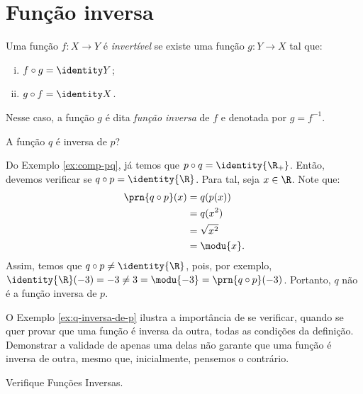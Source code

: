 \section{Função inversa}

\begin{definition}
\label{def:funcao-inversa}
Uma função $f: X \to Y$ é \emph{invertível} se existe uma função $g: Y \to X$ tal que:
%
\begin{enumerate}[(i)]
  \item $f \circ g = \identity Y$;
  \item $g \circ f = \identity X$.
\end{enumerate}
%
Nesse caso, a função $g$ é dita \emph{função inversa} de $f$ e denotada por $g = f^{-1}$.
\end{definition}

\begin{example}
\label{ex:q-inversa-de-p}
    A função $q$ é inversa de $p$?
\end{example}

\begin{solution}
Do Exemplo \ref{ex:comp-pq}, já temos que $p \circ q = \identity{\R_+}$.
Então, devemos verificar se $q \circ p = \identity{\R}$.
Para tal, seja $x \in \R$. 
Note que:
%
\begin{align*}
    \prn{q \circ p}(x) &= q(p(x)) \\ &= q(x^2) \\ &= \sqrt{x^2} \\ &= \modu{x}.
\end{align*}
%
Assim, temos que $q \circ p \ne \identity{\R}$, pois, por exemplo, $\identity{\R}(-3) = -3 \ne 3 = \modu{-3} = \prn{q \circ p}(-3)$.
Portanto, $q$ não é a função inversa de $p$.
\end{solution}

O Exemplo \ref{ex:q-inversa-de-p} ilustra a importância de se verificar, quando se quer provar que uma função é inversa da outra, todas as condições da definição.
Demonstrar a validade de apenas uma delas não garante que uma função é inversa de outra, mesmo que, inicialmente, pensemos o contrário.

\begin{onlineact}
    {Verifique Funções Inversas}.
\end{onlineact}